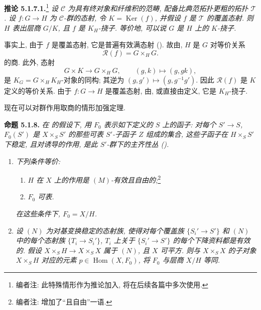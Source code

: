 \medskip
\noindent{}\textbf{推论 5.1.7.1.}\footnote{编者注: 此特殊情形作为推论加入, 将在后续各篇中多次使用.}
\textit{设 \(\mathscr C\) 为具有终对象和纤维积的范畴,
配备比典范拓扑更粗的拓扑 \(\mathcal T\).
设 \(f:G\to H\) 为 \(\mathscr C\)-群的态射,
令 \(K=\operatorname{Ker}(f)\), 并假设 \(f\) 是 \(\mathcal T\) 的覆盖态射.
则 \(H\) 表出层商 \(G/K\), 且 \(f\) 是 \(K_H\)-挠子.
等价地, 可以说 \(G\) 是 \(H\) 上的 \(K\)-挠子.}

事实上, 由于 \(f\) 是覆盖态射, 它是普遍有效满态射
().
故由, \(H\) 是 \(G\) 对等价关系
\[
  \mathscr R(f)=G\times_HG.
\]
的商. 此外, 态射
\[
  G\times K\longrightarrow G\times_HG,
  \qquad (g,k)\longmapsto(g,gk),
\]
是 \(K_G=G\times_HK_H\)-对象的同构; 其逆为
\((g,g')\mapsto(g,g^{-1}g')\). 因此 \(\mathscr R(f)\) 是 \(K\) 定义的等价关系.
由于 \(f:G\to H\) 是覆盖态射, 由,
或直接由定义, 它是 \(K_H\)-挠子.

现在可以对群作用取商的情形加强定理.

\medskip
\noindent{}\textbf{命题 5.1.8.}
\textit{在 的假设下,
用 \(F_0\) 表示如下定义的 \(S\) 上的函子: 对每个 \(S'\to S\),
\(F_0(S')\) 是 \(X\times_SS'\) 的那些可表 \(S'\)-子函子 \(Z\) 组成的集合,
这些子函子在 \(H\times_SS'\) 下稳定, 且对诱导的作用,
是此 \(S'\)-群下的主齐性丛 ().}
\begin{enumerate}
  \item[(i)] \textit{下列条件等价:}
  \begin{enumerate}
    \item[(a)] \textit{\(H\) 在 \(X\) 上的作用是 \((M)\)-有效且自由的;}\footnote{编者注: 增加了``且自由''一语.}
    \item[(b)] \textit{\(F_0\) 可表.}
  \end{enumerate}
  \textit{在这些条件下, \(F_0=X/H\).}
  \item[(ii)] \textit{设 \((N)\) 为对基变换稳定的态射族, 使得对每个覆盖族
\(\{S_i'\to S'\}\) 和 \((N)\) 中的每个态射族 \(\{T_i\to S_i'\}\),
\(T_i\) 上关于 \(\{S_i'\to S'\}\) 的每个下降资料都是有效的.
假设 \(X\times_SH\to X\times_SX\) 属于 \((N)\), 且 \(X\) 可平方.
则与 \(X\times_SX\) 的子对象 \(X\times_SH\) 对应的元素
\(p\in\operatorname{Hom}(X,F_0)\), 将 \(F_0\) 与层商 \(X/H\) 等同.}
\end{enumerate}

